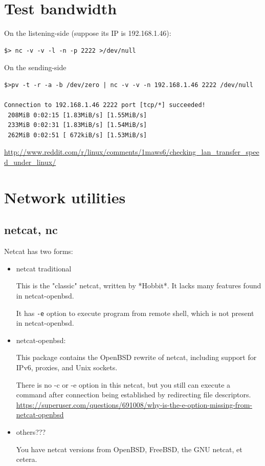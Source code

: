 \section{Test bandwidth}
\label{sec:bandwidth-test}


On the listening-side (suppose its IP is 192.168.1.46):
\begin{verbatim}
$> nc -v -v -l -n -p 2222 >/dev/null
\end{verbatim}

On the sending-side
\begin{verbatim}
$>pv -t -r -a -b /dev/zero | nc -v -v -n 192.168.1.46 2222 /dev/null

Connection to 192.168.1.46 2222 port [tcp/*] succeeded!
 208MiB 0:02:15 [1.83MiB/s] [1.55MiB/s]
 233MiB 0:02:31 [1.83MiB/s] [1.54MiB/s]
 262MiB 0:02:51 [ 672kiB/s] [1.53MiB/s]
\end{verbatim}

\url{http://www.reddit.com/r/linux/comments/1maws6/checking_lan_transfer_speed_under_linux/}


\section{Network utilities}

\subsection{netcat, nc}
\label{sec:netcat}

Netcat has two forms:
\begin{itemize}
  \item netcat traditional

This is the "classic" netcat, written by *Hobbit*. It lacks many
features found in netcat-openbsd.

It has \verb!-e! option to execute program from remote shell, which is not
present in netcat-openbsd.
  
  \item netcat-openbsd:

 This package contains the OpenBSD rewrite of netcat, including support
 for IPv6, proxies, and Unix sockets.
 
 There is no -c or -e option in this netcat, but you still can execute a
 command after connection being established by redirecting file descriptors.
 \url{https://superuser.com/questions/691008/why-is-the-e-option-missing-from-netcat-openbsd}
 
 \item others???
 
 You have netcat versions from OpenBSD, FreeBSD, the GNU netcat, et cetera.
   
\end{itemize}
 
